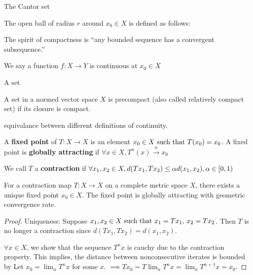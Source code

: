 The Cantor set

\begin{definition}
    The open ball of radius $r$ around $x_0\in X$ is defined as follows:
\end{definition}

The spirit of compactness is ``any bounded sequence has a convergent subsequence.''

\begin{definition}[Continuity]
    We say a function $f:X\rightarrow Y$ is continuous at $x_0\in X$
\end{definition}
\begin{definition}
    A set
\end{definition}
\begin{definition}
    A set in a normed vector space $X$ is precompact (also called relatively compact set) if its closure is compact.
\end{definition}

equivalance between different definitions of continuity.


\begin{definition}
    A \textbf{fixed point} of $T:X\rightarrow X$ is an element $x_0\in X\text{ such that } T(x_0)=x_0$. A fixed point is \textbf{globally attracting} if $\forall x\in X, T^n(x)\xrightarrow{n}x_0$
\end{definition}
We call $T$ a \textbf{contraction} if $\forall x_1,x_2\in X, d(Tx_1,Tx_2)\leq \alpha d(x_1,x_2),\alpha\in[0,1)$
\begin{theorem}
    For a contraction map $T:X\rightarrow X$ on a complete metric space $X$, there exists a unique fixed point $x_0\in X$. The fixed point is globally attracting with geometric convergence rate.
\end{theorem}
\begin{proof}
    Uniqueness: Suppose $x_1,x_2\in X\text{ such that } x_1=Tx_1,\,x_2=Tx_2$. Then $T$ is no longer a contraction since $d(Tx_1,Tx_2)=d(x_1,x_2)$.
    
    $\forall x\in X$, we show that the sequence $T^nx$ is cauchy due to the contraction property.
    This implies, the distance between nonconsecutive iterates is bounded by
    Let $x_0=\lim_n T^nx$ for some $x$. $\implies Tx_0=T\lim_n T^nx = \lim_n T^{n+1}x= x_0$.
\end{proof}

